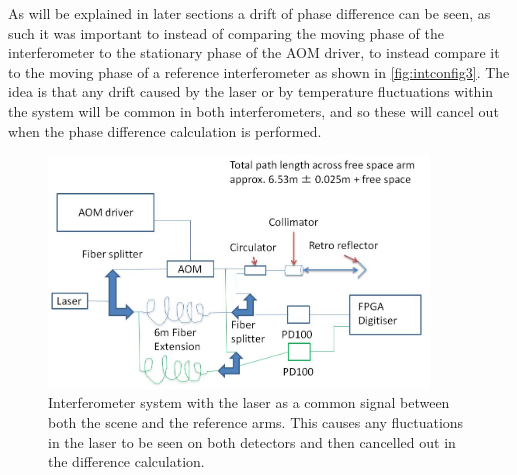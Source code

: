 \documentclass[12pt,a4paper,oneside]{report}
\begin{document}
As will be explained in later sections a drift of phase difference can be seen, as such it was important to instead of comparing the moving phase of the interferometer to the stationary phase of the AOM driver, to instead compare it to the moving phase of a reference interferometer as shown in \autoref{fig:intconfig3}. The idea is that any drift caused by the laser or by temperature fluctuations within the system will be common in both interferometers, and so these will cancel out when the phase difference calculation is performed. 
\begin{figure}[H] 
\includegraphics[width=0.9\textwidth, center,angle=0]{DImages/intconfig3.JPG}
\caption{Interferometer system with the laser as a common signal between both the scene and the reference arms. This causes any fluctuations in the laser to be seen on both detectors and then cancelled out in the difference calculation.}
\label{fig:intconfig3}
\end{figure}
\end{document}
